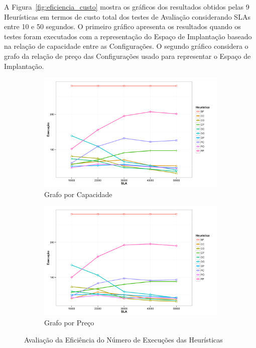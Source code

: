 A Figura~\ref{fig:eficiencia_custo} mostra os gráficos dos resultados obtidos pelas
9 Heurísticas em termos de custo total dos testes de Avaliação considerando SLAs 
entre 10 e 50 segundos. O primeiro gráfico apresenta os resultados quando os testes
foram executados com a representação do Espaço de Implantação baseado na relação de
capacidade entre as Configurações. O segundo gráfico considera o grafo da relação
de preço das Configurações usado para representar o Espaço de Implantação.

\begin{figure}[hbt]
  \centering
    \begin{subfigure}[a]{0.7\textwidth}
      \includegraphics[width=\textwidth]{img/ExecutionCount-Capacity}
      \caption{Grafo por Capacidade}
      \label{fig:eficiencia_execucoes_capacidade}
    \end{subfigure}
    \begin{subfigure}[b]{0.7\textwidth}
      \includegraphics[width=\textwidth]{img/ExecutionCount-Price}
      \caption{Grafo por Preço}
      \label{fig:eficiencia_execucoes_preco}
    \end{subfigure}
  \caption{\label{fig:eficiencia_execucoes}Avaliação da Eficiência do Número de Execuções das Heurísticas}
\end{figure}

